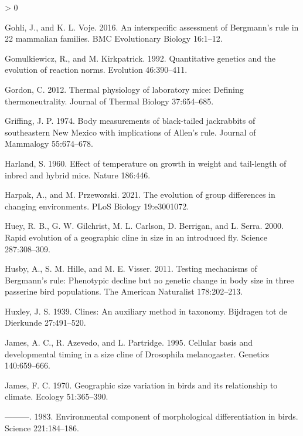 \documentclass[
]{article}
\newlength{\cslhangindent}
\newenvironment{CSLReferences}[2] %
 {%
  \setlength{\parindent}{0pt}
  \ifodd #1 \everypar{\setlength{\hangindent}{\cslhangindent}}\ignorespaces\fi
  \ifnum #2 > 0
  \setlength{\parskip}{#2\baselineskip}
  \fi
 }%
 {}
\begin{document}
\begin{CSLReferences}{0}{0}
\leavevmode\hypertarget{ref-Gohli2016}{}%
Gohli, J., and K. L. Voje. 2016. An interspecific assessment of
{Bergmann's} rule in 22 mammalian families. BMC Evolutionary Biology
16:1--12.

\leavevmode\hypertarget{ref-Gomulkiewicz1992}{}%
Gomulkiewicz, R., and M. Kirkpatrick. 1992. Quantitative genetics and
the evolution of reaction norms. Evolution 46:390--411.

\leavevmode\hypertarget{ref-Gordon2012}{}%
Gordon, C. 2012. Thermal physiology of laboratory mice: Defining
thermoneutrality. Journal of Thermal Biology 37:654--685.

\leavevmode\hypertarget{ref-Griffing1974}{}%
Griffing, J. P. 1974. Body measurements of black-tailed jackrabbits of
southeastern {New} {Mexico} with implications of {Allen's} rule. Journal
of Mammalogy 55:674--678.

\leavevmode\hypertarget{ref-Harland1960}{}%
Harland, S. 1960. Effect of temperature on growth in weight and
tail-length of inbred and hybrid mice. Nature 186:446.

\leavevmode\hypertarget{ref-Harpak2021}{}%
Harpak, A., and M. Przeworski. 2021. The evolution of group differences
in changing environments. PLoS Biology 19:e3001072.

\leavevmode\hypertarget{ref-Huey2000}{}%
Huey, R. B., G. W. Gilchrist, M. L. Carlson, D. Berrigan, and L. Serra.
2000. Rapid evolution of a geographic cline in size in an introduced
fly. Science 287:308--309.

\leavevmode\hypertarget{ref-Husby2011}{}%
Husby, A., S. M. Hille, and M. E. Visser. 2011. Testing mechanisms of
{Bergmann's} rule: Phenotypic decline but no genetic change in body size
in three passerine bird populations. The American Naturalist
178:202--213.

\leavevmode\hypertarget{ref-Huxley1939}{}%
Huxley, J. S. 1939. Clines: An auxiliary method in taxonomy. Bijdragen
tot de Dierkunde 27:491--520.

\leavevmode\hypertarget{ref-James1995}{}%
James, A. C., R. Azevedo, and L. Partridge. 1995. Cellular basis and
developmental timing in a size cline of {Drosophila} melanogaster.
Genetics 140:659--666.

\leavevmode\hypertarget{ref-James1970}{}%
James, F. C. 1970. Geographic size variation in birds and its
relationship to climate. Ecology 51:365--390.

\leavevmode\hypertarget{ref-James1983}{}%
---------. 1983. Environmental component of morphological
differentiation in birds. Science 221:184--186.


\end{CSLReferences}
\end{document}
